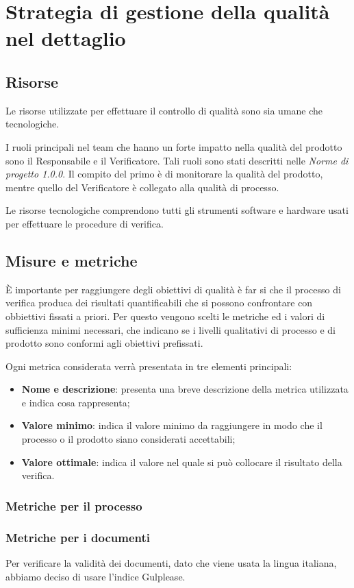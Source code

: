 \section{Strategia di gestione della qualità nel dettaglio}
\subsection{Risorse}
Le risorse utilizzate per effettuare il controllo di qualità sono sia umane che tecnologiche.

I ruoli principali nel team che hanno un forte impatto nella qualità del prodotto sono il Responsabile e il Verificatore. Tali ruoli sono stati descritti nelle \textit{Norme di progetto 1.0.0}\docs. Il compito del primo è di monitorare la qualità del prodotto, mentre quello del Verificatore è collegato alla qualità di processo.

Le risorse tecnologiche comprendono tutti gli strumenti software e hardware usati per effettuare le procedure di verifica. 
\subsection{Misure e metriche}
\`{E} importante per raggiungere degli obiettivi di qualità è far si che il processo di verifica produca dei risultati quantificabili che si possono confrontare con obbiettivi fissati a priori. Per questo vengono scelti le metriche ed i valori di sufficienza minimi necessari, che indicano se i livelli qualitativi di processo e di prodotto sono conformi agli obiettivi prefissati.

Ogni metrica considerata verrà presentata in tre elementi principali:
\begin{itemize}
	\item \textbf{Nome e descrizione}: presenta una breve descrizione della metrica utilizzata e indica cosa rappresenta;
	\item \textbf{Valore minimo}: indica il valore minimo da raggiungere in modo che il processo o il prodotto siano considerati accettabili;
	\item \textbf{Valore ottimale}: indica il valore nel quale si può collocare il risultato della verifica.
\end{itemize}

\subsubsection{Metriche per il processo}
\subsubsection{Metriche per i documenti}
Per verificare la validità dei documenti, dato che viene usata la lingua italiana, abbiamo deciso di usare l'indice Gulplease. 
